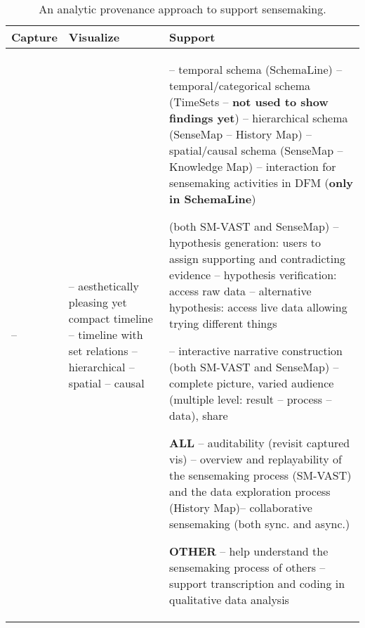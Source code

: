 \begin{table}[ht]
	\small\sffamily
	\centering
	\caption{An analytic provenance approach to support sensemaking.}
	\begin{tabularx}{\columnwidth}{YL{.2\columnwidth}L{.5\columnwidth}}
		\toprule
		Capture & Visualize & Support \\ 
		\midrule
		 \linebreak --  &
		
		-- aesthetically pleasing yet compact timeline \linebreak 
		-- timeline with set relations \linebreak 
		-- hierarchical \linebreak -- spatial \linebreak -- causal & 
		
		\linebreak
		-- temporal schema (SchemaLine) \linebreak
		-- temporal/categorical schema (TimeSets -- \textbf{not used to show findings yet})\linebreak
		-- hierarchical schema (SenseMap -- History Map) \linebreak
		-- spatial/causal schema (SenseMap -- Knowledge Map) \linebreak
		-- interaction for sensemaking activities in DFM (\textbf{only in SchemaLine}) 
		
		\bigskip{} (both SM-VAST and SenseMap)\linebreak
		-- hypothesis generation: users to assign supporting and contradicting evidence \linebreak
		-- hypothesis verification: access raw data\linebreak
		-- alternative hypothesis: access live data allowing trying different things		
	
		\bigskip{}\linebreak
		-- interactive narrative construction (both SM-VAST and SenseMap)\linebreak
		-- complete picture, varied audience (multiple level: result -- process -- data), share 
		
		\bigskip\textbf{ALL}\linebreak		
		-- auditability (revisit captured vis) \linebreak-- overview and replayability of the sensemaking process (SM-VAST) and the data exploration process (History Map)\linebreak -- collaborative sensemaking (both sync. and async.)
		
		\bigskip\textbf{OTHER}\linebreak		
		-- help understand the sensemaking process of others \linebreak-- support transcription and coding in qualitative data analysis\\ 

		\bottomrule
	\end{tabularx} 
\end{table}